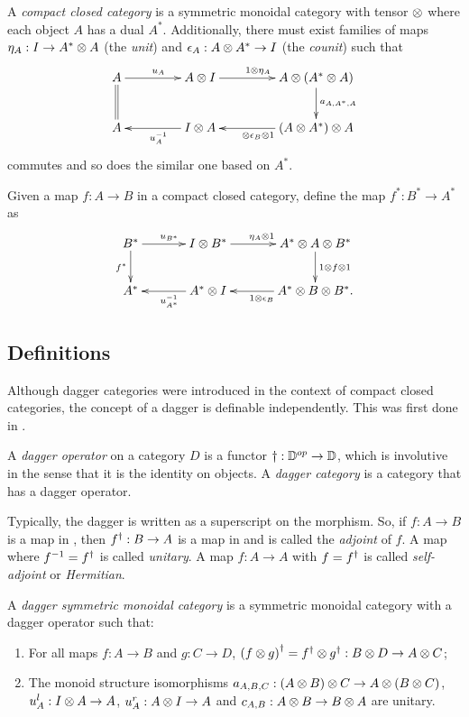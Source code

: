 \begin{definition}\label{def:compactclosedcat}
A \emph{compact closed category} \cD{} is a symmetric monoidal category with tensor $\otimes$ where each
object $A$ has a dual $A^{*}$. Additionally, there must exist families of maps $\eta_{A}: I \to
A^{*} \otimes A$ (the \emph{unit}) and $\epsilon_{A}: A\otimes A^{*}\to I$ (the \emph{counit}) such that
\[
  \xymatrix@C+20pt{
    A \ar[r]^{u_{A}} \ar@{=}[d]  & A\*I \ar[r]^{1\*\eta_{A}}
        & A\* (A^{*}\*A) \ar[d]^{a_{A,A^{*},A}} \\
    A & I\* A \ar[l]^{u_{A}^{-1}} & (A\* A^{*})\*A \ar[l]^{\*\epsilon_{B}\*1}
    }
  \]
commutes and so does the similar one based on $A^{*}$.
\end{definition}

Given a map $f:A\to B$ in a compact closed category,  define the map $f^{*}:B^{*} \to A^{*}$ as
\[
  \xymatrix@C+10pt{
    B^{*}\ar[r]^{u_{B^{*}}} \ar[d]_{f^{*}}& I\*B^{*} \ar[r]^{\eta_{A}\*1}
      & A^{*}\*A\*B^{*}\ar[d]^{1\*f\*1}\\
    A^{*}&    A^{*}\*I\ar[l]^{u_{A^{*}}^{-1}}  &   A^{*}\*B\*B^{*}\ar[l]^{1\*\epsilon_{B}}.
  }
\]



\subsection{Definitions}\label{sec:daggerdefinitions}

Although dagger categories were introduced in the context of compact closed categories, the concept
of a dagger is definable independently. This was first done in \cite{selinger05:dagger}.

\begin{definition}\label{def:daggercat}
  A \emph{dagger operator} on a category $D$ is a functor $\dagger:\mathbb{D}^{op}\to \mathbb{D}$, which is
  involutive in the sense that it is the identity on objects. A \emph{dagger category} is a category
  that has a dagger operator.
\end{definition}

Typically, the dagger is written as a superscript on the morphism. So, if $f:A\to B$ is a map in
\cD, then ${f}^{\dagger}:B\to A$ is a map in \cD{} and is called the \emph{adjoint} of $f$. A map where
$f^{-1} = {f}^{\dagger}$ is called \emph{unitary}. A map $f:A\to A$ with $f={f}^{\dagger}$ is called
\emph{self-adjoint} or \emph{Hermitian}.

\begin{definition}\label{def:daggersmc}
  A \emph{dagger symmetric monoidal category} is a symmetric monoidal category \cD{} with a dagger
  operator such that:
  \begin{enumerate}[{(}i{)}]
    \item For all maps $f:A\to B$ and $g:C\to D$, ${(f\otimes g)}^{\dagger} = {f}^{\dagger}\otimes{g}^{\dagger}:B\otimes D \to A\otimes C$;\label{defitem:dagger_smc_one}
    \item The monoid structure isomorphisms $a_{A,B,C}:(A\otimes B)\otimes C\to A\otimes(B\otimes C)$, $u^l_{A}:I\otimes A\to
      A$, $u^r_{A}:A\otimes I \to A$ and  $c_{A,B}:A\otimes B \to B\otimes A$ are unitary.\label{defitem:dagger_smc_two}
  \end{enumerate}
\end{definition}


